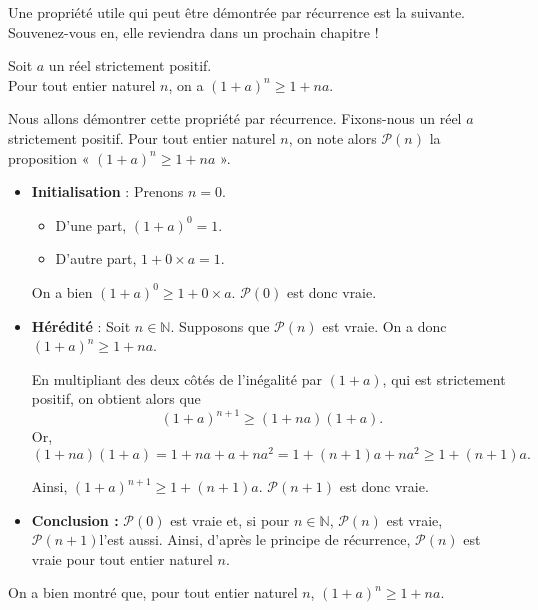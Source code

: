 \documentclass[11pt,fleqn]{book} %
\begin{document}
Une propriété utile qui peut être démontrée par récurrence est la suivante. Souvenez-vous en, elle reviendra dans un prochain chapitre !

\begin{proposition} Soit $a$ un réel strictement positif. \\ Pour tout entier naturel $n$, on a $(1+a)^n \geqslant 1+na$.\end{proposition}

\begin{demonstration}Nous allons démontrer cette propriété par récurrence. Fixons-nous un réel $a$ strictement positif. Pour tout entier naturel $n$, on note alors $\mathcal{P}(n)$ la proposition « $(1+a)^n \geqslant 1+na$ ».
\begin{itemize}
\item \textbf{Initialisation} : Prenons $n=0$. 
\begin{itemize}
\item D'une part, $(1+a)^0 = 1$.
\item D'autre part, $1+ 0 \times a = 1$. \end{itemize}
On a bien $(1+a)^0 \geqslant 1+0 \times a$. $\mathcal{P}(0)$ est donc vraie.
\item \textbf{Hérédité} : Soit $n\in\mathbb{N}$. Supposons que $\mathcal{P}(n)$ est vraie. On a donc $(1+a)^n \geqslant 1+na$. 

En multipliant des deux côtés de l'inégalité par $(1+a)$, qui est strictement positif, on obtient alors que \[(1+a)^{n+1}\geqslant (1+na)(1+a).\] Or, 
\[(1+na)(1+a)=1+na+a+na^2=1+(n+1)a+na^2 \geqslant 1+(n+1)a.\]

Ainsi, $(1+a)^{n+1} \geqslant 1+(n+1)a$. $\mathcal{P}(n+1)$ est donc vraie.
\item \textbf{Conclusion :} $\mathcal{P}(0)$ est vraie et, si pour $n\in\mathbb{N}$, $\mathcal{P}(n)$ est vraie, $\mathcal{P}(n+1)$l'est aussi. Ainsi, d'après le principe de récurrence, $\mathcal{P}(n)$ est vraie pour tout entier naturel $n$.
\end{itemize}

On a bien montré que, pour tout entier naturel $n$, $(1+a)^n \geqslant 1+na$.\end{demonstration}
\end{document}
